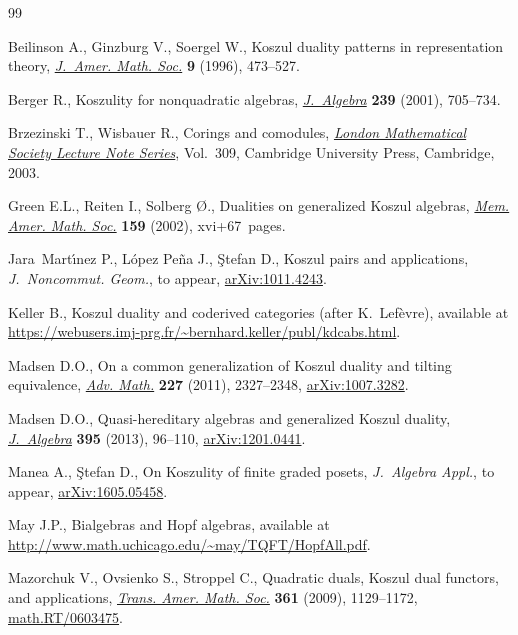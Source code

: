 \documentclass[pdftex]{sigma}
\renewcommand{\^}[1]{\mbox{$^{\left( #1 \right)}$}}
\renewcommand{\_}[1]{\mbox{$_{\left( #1 \right)}$}}
\numberwithin{equation}{section}
\begin{document}
\begin{thebibliography}{99}
\footnotesize\itemsep=0pt

Beilinson A., Ginzburg V., Soergel W., Koszul duality patterns in
 representation theory, \href{http://dx.doi.org/10.1090/S0894-0347-96-00192-0}{\textit{J.~Amer. Math. Soc.}} \textbf{9} (1996),
 473--527.

Berger R., Koszulity for nonquadratic algebras, \href{http://dx.doi.org/10.1006/jabr.2000.8703}{\textit{J.~Algebra}}
 \textbf{239} (2001), 705--734.

Brzezinski T., Wisbauer R., Corings and comodules, \href{http://dx.doi.org/10.1017/CBO9780511546495}{\textit{London Mathematical
 Society Lecture Note Series}}, Vol.~309, Cambridge University Press,
 Cambridge, 2003.

Green E.L., Reiten I., Solberg {\O}., Dualities on generalized {K}oszul
 algebras, \href{http://dx.doi.org/10.1090/memo/0754}{\textit{Mem. Amer. Math. Soc.}} \textbf{159} (2002), xvi+67~pages.

Jara~Mart\'{\i}nez P., L\'opez Pe\~na J., \c{S}tefan D., Koszul pairs and
 applications, \textit{J.~Noncommut. Geom.}, {t}o appear, \href{http://arxiv.org/abs/1011.4243}{arXiv:1011.4243}.

Keller B., Koszul duality and coderived categories (after {K}.~{L}ef\`{e}vre),
 available at \url{https://webusers.imj-prg.fr/~bernhard.keller/publ/kdcabs.html}.

Madsen D.O., On a common generalization of {K}oszul duality and tilting
 equivalence, \href{http://dx.doi.org/10.1016/j.aim.2011.05.003}{\textit{Adv. Math.}} \textbf{227} (2011), 2327--2348,
 \href{http://arxiv.org/abs/1007.3282}{arXiv:1007.3282}.

Madsen D.O., Quasi-hereditary algebras and generalized {K}oszul duality,
 \href{http://dx.doi.org/10.1016/j.jalgebra.2013.08.005}{\textit{J.~Algebra}} \textbf{395} (2013), 96--110, \href{http://arxiv.org/abs/1201.0441}{arXiv:1201.0441}.

Manea A., \c{S}tefan D., On Koszulity of f\/inite graded posets,
 \textit{J.~Algebra Appl.}, {t}o appear, \href{http://arxiv.org/abs/1605.05458}{arXiv:1605.05458}.

May J.P., Bialgebras and {H}opf algebras, available at
 \url{http://www.math.uchicago.edu/~may/TQFT/HopfAll.pdf}.

Mazorchuk V., Ovsienko S., Stroppel C., Quadratic duals, {K}oszul dual
 functors, and applications, \href{http://dx.doi.org/10.1090/S0002-9947-08-04539-X}{\textit{Trans. Amer. Math. Soc.}} \textbf{361}
 (2009), 1129--1172, \href{http://arxiv.org/abs/math.RT/0603475}{math.RT/0603475}.


\end{thebibliography}
\end{document}
